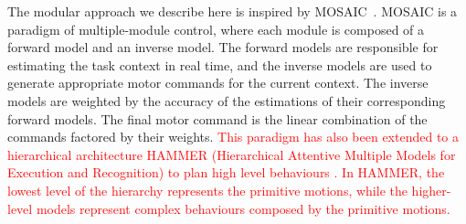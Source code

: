 

The modular approach we describe here is inspired by
MOSAIC~\citep[MOdular Selection And
Identification for Control, ][]{haruno2001mosaic}. MOSAIC is a paradigm of multiple-module control,
where each module is composed of a forward model and an inverse
model. The forward models are responsible for estimating the task
context in real time, and the inverse models are used to generate
appropriate motor commands for the current context. The inverse models
are weighted by the accuracy of the estimations of their corresponding
forward models. The final motor command is the linear combination of
the commands factored by their weights. \textcolor{red}{This paradigm
  has also been extended to a hierarchical architecture HAMMER (Hierarchical Attentive Multiple Models for Execution and Recognition) to plan high level behaviours \citep{johnson2005hierarchies,demiris2006hierarchical}. In HAMMER, the lowest level of the hierarchy represents the primitive motions, while the higher-level models represent complex behaviours composed by the primitive motions. }

